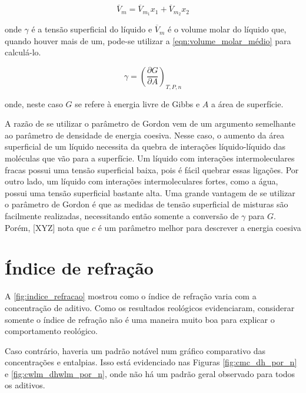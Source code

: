		\begin{equation}
			\overline{V}_m = \overline{V}_{m_{1}}x_1 + \overline{V}_{m_{2}}x_2
			\label{eqn:volume_molar_médio}
		\end{equation}
		
		\noindent onde \(\gamma\) é a tensão superficial do líquido e \(\overline{V}_m\) é o volume molar do líquido que, quando houver mais de um, pode-se utilizar a \autoref{eqn:volume_molar_médio} para calculá-lo.
		
		\begin{equation}
		\gamma = \left( \dfrac{\partial G}{\partial A}  \right)_{T,P,n}
		\label{eqn:tens_superficial}
		\end{equation}
		
		\noindent onde, neste caso \(G\) se refere à energia livre de Gibbs e \(A\) a área de superfície.
		
		A razão de se utilizar o parâmetro de Gordon vem de um argumento semelhante ao parâmetro de densidade de energia coesiva. Nesse caso, o aumento da área superficial de um líquido necessita da quebra de interações líquido-líquido das moléculas que vão para a superfície. Um líquido com interações intermoleculares fracas possui uma tensão superficial baixa, pois é fácil quebrar essas ligações. Por outro lado, um líquido com interações intermoleculares fortes, como a água, possui uma tensão superficial bastante alta. Uma grande vantagem de se utilizar o parâmetro de Gordon é que as medidas de tensão superficial de misturas são facilmente realizadas, necessitando então somente a conversão de \(\gamma\) para \(G\). Porém, [XYZ] nota que \(c\) é um parâmetro melhor para descrever a energia coesiva %
	

		\section{Índice de refração}
		
		A \autoref{fig:indice_refracao} mostrou como o índice de refração varia com a concentração de aditivo. Como os resultados reológicos evidenciaram, considerar somente o índice de refração não é uma maneira muito boa para explicar o comportamento reológico.
		
		Caso contrário, haveria um padrão notável num gráfico comparativo das concentrações e entalpias. Isso está evidenciado nas Figuras \ref{fig:cmc_dh_por_n} e \ref{fig:cwlm_dhwlm_por_n}, onde não há um padrão geral observado para todos os aditivos.
		
